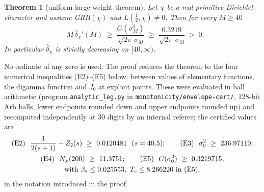 \documentclass[11pt]{amsart}
\newtheorem{theorem}{Theorem}[section]
\theoremstyle{definition}
\numberwithin{equation}{section}
\newcommand{\hd}{\widehat\delta}
\begin{document}
\begin{theorem}[uniform large-weight theorem]\label{thm:E}
Let $\chi$ be a real primitive Dirichlet character and assume
GRH$(\chi)$ and $L(\tfrac12,\chi)\ne0$. Then for every $M\ge40$
\[
-M\,\hd_\chi'(M)\;\ge\;\frac{G(\sigma_M^2)}{\sqrt{2\pi}\,\sigma_M}
\;\ge\;\frac{0.3219}{\sqrt{2\pi}\,\sigma_M}\;>\;0 .
\]
In particular $\hd_\chi$ is strictly decreasing on $[40,\infty)$.
\end{theorem}

No ordinate of any zero is used. The proof reduces the theorem to the
four numerical inequalities \textup{(E2)--(E5)} below, between values
of elementary functions, the digamma function and $J_0$ at explicit
points. These were evaluated in ball arithmetic (program
\texttt{analytic\_leg.py} in \texttt{monotonicity/envelope-cert/},
$128$-bit Arb balls, lower endpoints rounded down and upper endpoints
rounded up) and recomputed independently at $30$ digits by an internal
referee; the certified values are
\begin{equation}\label{eq:Evalues}
\begin{gathered}
\textup{(E2)}\ \ \frac1{2(s+1)}-Z_2(s)\ \ge\ 0.0120481\ \ (s=40.5);\qquad
\textup{(E3)}\ \ \sigma_0^2\ \ge\ 236.97110;\\
\textup{(E4)}\ \ N_\chi(200)\ \ge\ 11.3751;\qquad
\textup{(E5)}\ \ G(\sigma_0^2)\ \ge\ 0.3219715,\\
\text{with }\beta_*\le0.025553,\ T_c\le8.266220\text{ in (E5)},
\end{gathered}
\end{equation}
in the notation introduced in the proof.
\end{document}
